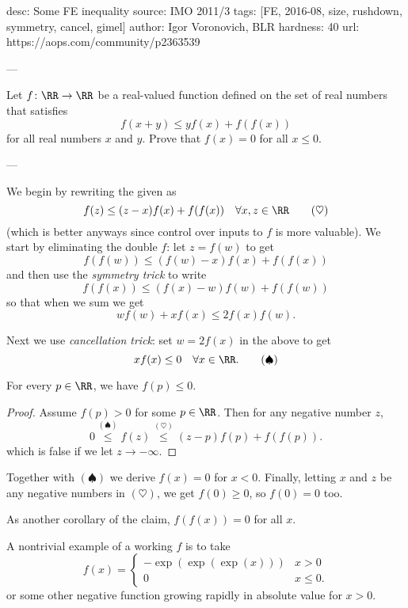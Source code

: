 desc: Some FE inequality
source: IMO 2011/3
tags: [FE, 2016-08, size, rushdown, symmetry, cancel, gimel]
author: Igor Voronovich, BLR
hardness: 40
url: https://aops.com/community/p2363539

---

Let $f \colon \RR \to \RR$ be a real-valued function
defined on the set of real numbers that satisfies
\[ f(x+y) \leq yf(x) + f(f(x))\]
for all real numbers $x$ and $y$.
Prove that $f(x) = 0$ for all $x \leq 0$.

---

We begin by rewriting the given as
\[ f(z) \le (z-x)f(x) + f(f(x)) \quad
  \forall x,z \in \RR \qquad (\heartsuit) \]
(which is better anyways since control over inputs to $f$
is more valuable).
We start by eliminating the double $f$:
let $z = f(w)$ to get
\[ f(f(w)) \le (f(w)-x)f(x) + f(f(x)) \]
and then use the \emph{symmetry trick} to write
\[ f(f(x)) \le (f(x)-w)f(w) + f(f(w)) \]
so that when we sum we get
\[ wf(w) + xf(x) \le 2f(x)f(w). \]


Next we use \emph{cancellation trick}:
set $w = 2f(x)$ in the above to get
\[ xf(x) \le 0 \quad \forall x \in \RR. \qquad (\spadesuit) \]

\begin{claim*}
  For every $p \in \RR$, we have $f(p) \le 0$.
\end{claim*}
\begin{proof}
  Assume $f(p) > 0$ for some $p \in \RR$.
  Then for any negative number $z$,
  \[ 0 \overset{(\spadesuit)}{\le} f(z)
    \overset{(\heartsuit)}{\le} (z-p)f(p) + f(f(p)). \]
  which is false if we let $z \to -\infty$.
\end{proof}

Together with $(\spadesuit)$ we derive $f(x) = 0$ for $x < 0$.
Finally, letting $x$ and $z$ be any negative numbers
in $(\heartsuit)$, we get $f(0) \ge 0$, so $f(0) = 0$ too.
\begin{remark*}
  As another corollary of the claim, $f(f(x)) = 0$ for all $x$.
\end{remark*}
\begin{remark*}
  A nontrivial example of a working $f$
  is to take
  \[ f(x) = \begin{cases}
      -\exp(\exp(\exp(x))) & x > 0 \\
      0 & x \le 0.
    \end{cases} \]
  or some other negative function growing rapidly in absolute value
  for $x > 0$.
\end{remark*}
